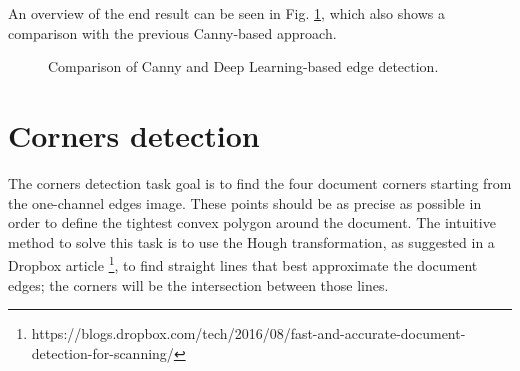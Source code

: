 \documentclass[a4paper]{article}
\begin{document}
An overview of the end result can be seen in Fig. \ref{fig:deep_comparison}, which also shows a comparison with the previous Canny-based approach.

\begin{figure}[H]
	\centering

	\caption{Comparison of Canny and Deep Learning-based edge detection.}
	\label{fig:deep_comparison}
\end{figure}

\section{Corners detection}

The corners detection task goal is to find the four document corners starting from the one-channel edges image. These points should be as precise as possible in order to define the tightest convex polygon around the document. The intuitive method to solve this task is to use the Hough transformation, as suggested in a Dropbox article \footnote{https://blogs.dropbox.com/tech/2016/08/fast-and-accurate-document-detection-for-scanning/}, to find straight lines that best approximate the document edges; the corners will be the intersection between those lines.
\end{document}
